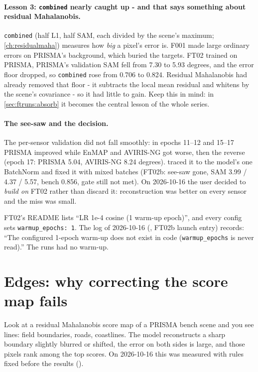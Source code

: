 \paragraph{Lesson 3: \texttt{combined} nearly caught up - and that says something about residual Mahalanobis.}
\texttt{combined} (half L1, half SAM, each divided by the scene's maximum; \cref{ch:residualmaha}) measures how
\emph{big} a pixel's error is. F001 made large ordinary errors on PRISMA's background, which buried the targets.
FT02 trained on PRISMA, PRISMA's validation SAM fell from 7.30 to 5.93 degrees, and the error floor dropped, so
\texttt{combined} rose from 0.706 to 0.824. Residual Mahalanobis had already removed that floor - it subtracts the
local mean residual and whitens by the scene's covariance - so it had little to gain. Keep this in mind: in
\cref{sec:ftruns:absorb} it becomes the central lesson of the whole series.

\paragraph{The see-saw and the decision.} The per-sensor validation did not fall smoothly: in epochs 11--12 and
15--17 PRISMA improved while EnMAP and AVIRIS-NG got worse, then the reverse (epoch 17: PRISMA 5.04, AVIRIS-NG 8.24
degrees).  traced it to the model's one BatchNorm and fixed it with mixed batches (FT02b: see-saw
gone, SAM 3.99 / 4.37 / 5.57, bench 0.856, gate still not met). On 2026-10-16 the user decided to \emph{build on}
FT02 rather than discard it: reconstruction was better on every sensor and the miss was small.

\begin{sourcenote}
FT02's README lists ``LR 1e-4 cosine (1 warm-up epoch)'', and every config sets \texttt{warmup\_epochs: 1}. The
log of 2026-10-16 (, FT02b launch entry) records: ``The
configured 1-epoch warm-up does not exist in code (\texttt{warmup\_epochs} is never read).'' The runs had no warm-up.
\end{sourcenote}

\section{Edges: why correcting the score map fails}\label{sec:ftruns:edges}

Look at a residual Mahalanobis score map of a PRISMA bench scene and you see lines: field boundaries, roads,
coastlines. The model reconstructs a sharp boundary slightly blurred or shifted, the error on both sides is large,
and those pixels rank among the top scores. On 2026-10-16 this was measured with rules fixed before the results
().

